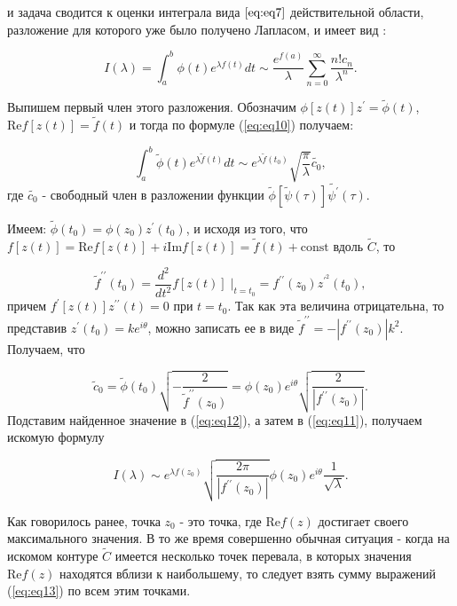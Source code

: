 \documentclass[14pt, a4paper]{article}
\numberwithin{figure}{section}
\numberwithin{equation}{section}
\renewcommand{\Re}{\mathrm{Re}}
\renewcommand{\Im}{\mathrm{Im}}
\newcommand{\const}{\mathrm{const}}
\begin{document}
и задача сводится к оценки интеграла вида $\ref{eq:eq7}$ действительной области, разложение для которого уже было получено Лапласом, и имеет вид \cite{Wong}:

$$
I(\lambda) = \int_{a}^{b}\phi(t)e^{\lambda f(t)}dt \sim \frac{e^{f(a)}}{\lambda}\sum_{n=0}^{\infty}\frac{n! c_n}{\lambda^n}.
$$

Выпишем первый член этого разложения. Обозначим $\phi[z(t)]z^\prime = \widetilde{\phi}(t)$, $\Re f[z(t)] = \widetilde{f}(t)$ и тогда по формуле (\ref{eq:eq10}) получаем:

\begin{equation}\label{eq:eq12}
\int_{a}^{b} \widetilde{\phi}(t) e^{\lambda \widetilde{f}(t)}dt \sim e^{\lambda \widetilde{f}(t_0)} \sqrt{\frac{\pi}{\lambda}} \widetilde{c_0},
\end{equation}
где $\widetilde{c_0}$ - свободный член в разложении функции $\widetilde{\phi}[\widetilde{\psi}(\tau)]\widetilde{\psi^\prime}(\tau)$.

Имеем: $\widetilde{\phi}(t_0) = \phi(z_0) z^\prime (t_0)$, и исходя из того, что $f[z(t)] = \Re f[z(t)]+ i \Im f[z(t)] = \widetilde{f}(t)+\const$ вдоль $\widetilde{C}$, то

\begin{equation}\nonumber
\widetilde{f}^{\prime\prime} (t_0) = \frac{d^2}{d t^2} f[z(t)]\;|_{t=t_0} = f^{\prime\prime} (z_0) z^{\prime^2} (t_0),
\end{equation}
причем $f^\prime[z(t)] z^{\prime \prime} (t) = 0$ при $t=t_0$. Так как эта величина отрицательна, то представив $z^\prime (t_0) = k e^{i \theta}$, можно записать ее в виде $\widetilde{f}^{\prime\prime}=-|f^{\prime\prime}(z_0)| k^2$. Получаем, что 

\begin{equation}\nonumber
\widetilde{c}_0=\widetilde{\phi}(t_0) \sqrt{-\frac{2}{\widetilde{f}^{\prime\prime}(z_0)}}= \phi (z_0) e^{i \theta} \sqrt{\frac{2}{|f^{\prime\prime}(z_0)|}}.
\end{equation}
Подставим найденное значение в (\ref{eq:eq12}), а затем в (\ref{eq:eq11}), получаем искомую формулу

\begin{equation}\label{eq:eq13}
I(\lambda) \sim e^{\lambda f (z_0)}\sqrt{\frac{2\pi}{|f^{\prime \prime} (z_0)|}} \phi(z_0) e^{i \theta} \frac{1}{\sqrt{\lambda}}.
\end{equation}

Как говорилось ранее, точка $z_0$ - это точка, где $\Re f(z)$ достигает своего максимального значения. В то же время совершенно обычная ситуация - когда на искомом контуре $\widetilde{C}$ имеется несколько точек перевала, в которых значения $\Re f (z)$ находятся вблизи к наибольшему, то следует взять сумму выражений (\ref{eq:eq13}) по всем этим точками. 
\end{document}
